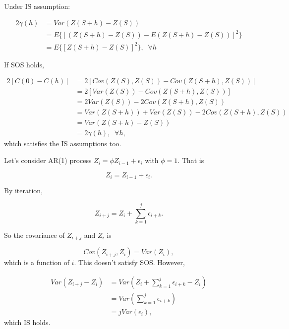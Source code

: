 \documentclass{article}\usepackage[]{graphicx}\usepackage[]{color}
\begin{document}
\begin{appendices}
Under IS assumption:

\begin{align}
2\gamma(h) & = Var(Z(S+h)-Z(S)) \\
& = E\{[ (Z(S+h)-Z(S))-E(Z(S+h)-Z(S)) ]^2\}\\
& = E\{[Z(S+h)-Z(S)]^2\},\;\;\forall h
\end{align}

If SOS holds, 

\begin{align}
2[C(0)-C(h)] & =2[Cov(Z(S),Z(S))-Cov(Z(S+h),Z(S))]\\
& = 2[Var(Z(S))-Cov(Z(S+h),Z(S))]\\
& = 2Var(Z(S)) - 2 Cov(Z(S+h),Z(S))\\
& = Var(Z(S+h)) + Var(Z(S)) - 2 Cov(Z(S+h),Z(S))\\
& = Var(Z(S+h)-Z(S))\\
& = 2\gamma(h),\;\;\forall h,
\end{align}
which satisfies the IS assumptions too. 

Let's consider AR(1) process  $Z_i = \phi Z_{i-1}+\epsilon_i$ with $\phi=1$. That is 

\begin{equation}
Z_i = Z_{i-1}+\epsilon_i.
\end{equation}

By iteration,

\begin{equation}
Z_{i +j} = Z_i + \sum_{k=1}^j \epsilon_{i+k}.
\end{equation}

So the covariance of $Z_{i+j}$ and $Z_i$ is

\begin{equation}
Cov(Z_{i+j},Z_i) = Var(Z_i),
\end{equation}
which is a function of $i$. This doesn't satisfy SOS. However, 

\begin{align}
Var(Z_{i+j}-Z_i) & = Var(Z_i + \sum_{k=1}^j \epsilon_{i+k}-Z_i)\\
 & = Var(\sum_{k=1}^j \epsilon_{i+k})\\
 & = jVar(\epsilon_i),
\end{align}
which IS holds.

\end{appendices}


\newpage

\end{document}
